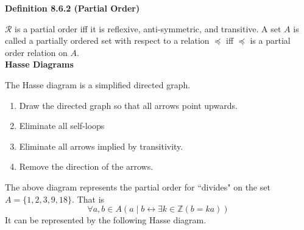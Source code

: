 \documentclass[a4paper]{article}
\makeatletter
\newcommand{\subheading}[1]{{\scriptsize\textbf{#1}}}
\def\tikzscale{1}\begin{lrbox}{\measure@tikzpicture}%
\edef\tikzscale{\pgfmathresult}%
\makeatother
\begin{document}
\begin{multicols*}{4}
\subheading{Definition 8.6.2 (Partial Order)}

$\mathcal{R}$ is a partial order iff it is reflexive, anti-symmetric, and
transitive. A set $A$ is called a partially ordered set with respect to a
relation $\preceq$ iff $\preceq$ is a partial order relation on $A$.\\

\subheading{Hasse Diagrams}

The Hasse diagram is a simplified directed graph.
\begin{enumerate} \itemsep -0.5em
  \item Draw the directed graph so that all arrows point upwards.
  \item Eliminate all self-loops
  \item Eliminate all arrows implied by transitivity.
  \item Remove the direction of the arrows.
\end{enumerate}
\begin{center}
\begin{scaletikzpicturetowidth}{0.8\columnwidth}
\end{scaletikzpicturetowidth}
\end{center}

The above diagram represents the partial order for ``divides" on the set $A=\{1,
2, 3, 9, 18\}$. That is
$$\forall a, b \in A (a\;|\;b \longleftrightarrow \exists k \in
\mathbb{Z}(b=ka))$$
It can be represented by the following Hasse diagram.


\end{multicols*}
\end{document}
